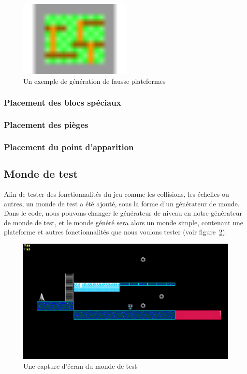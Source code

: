 \documentclass[10pt]{report}
\begin{document}
\begin{figure}[H]
  \centering
  \includegraphics[width=0.5\textwidth]{images/fake_platforms.png}
  \caption{Un exemple de génération de fausse plateformes}
  \label{fig:fake_platforms}
\end{figure}

\subsubsection{Placement des blocs spéciaux}

\subsubsection{Placement des pièges}

\subsubsection{Placement du point d'apparition}

\subsection{Monde de test}

Afin de tester des fonctionnalités du jeu comme les collisions, les 
échelles ou autres, un monde de test a été ajouté, sous la forme d'un 
générateur de monde. Dans le code, nous pouvons changer le générateur de
niveau en notre générateur de monde de test, et le monde généré sera alors
un monde simple, contenant une plateforme et autres fonctionnalités que
nous voulons tester (voir figure~\ref{fig:test_world}).

\begin{figure}[H]
  \centering
  \includegraphics[width=\textwidth]{images/test_world.png}
  \caption{Une capture d'écran du monde de test}
  \label{fig:test_world}
\end{figure}
\end{document}
